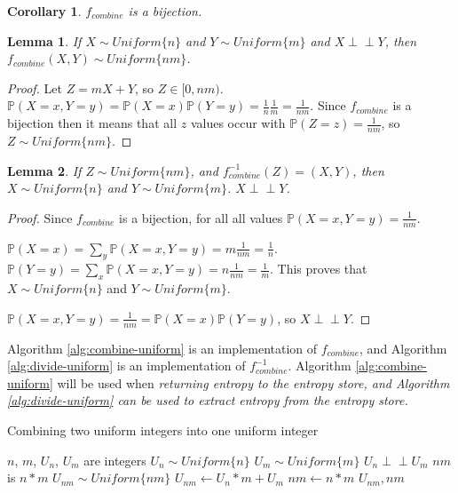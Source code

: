 \documentclass[12pt]{article}
\newtheorem{lemma}{Lemma}
\newtheorem{corollary}{Corollary}
\newcommand{\indep}{\perp\!\!\!\perp}
\begin{document}
\begin{corollary}
    $f_{combine}$ is a bijection.
\end{corollary}

\begin{lemma}
    If $X \sim Uniform\{n\}$ and $Y \sim Uniform\{m\}$ and $X \indep Y$, then 
    $f_{combine}(X,Y) \sim Uniform \{nm\}$.
\end{lemma}

\begin{proof}
    Let $Z = mX+Y$, so $Z \in [0,nm)$. $\mathbb{P}(X=x,Y=y) = \mathbb{P}(X=x)\mathbb{P}(Y=y) = \frac{1}{n}\frac{1}{m} = \frac{1}{nm}$. Since $f_{combine}$ is a bijection then it means that all $z$ values occur with $\mathbb{P}(Z=z) = \frac{1}{nm}$, so $Z \sim Uniform\{nm\}$.
    
\end{proof}

\begin{lemma}
    If $Z \sim Uniform \{nm\}$, and $f^{-1}_{combine}(Z) = (X,Y)$, then $X \sim Uniform\{n\}$ and $Y \sim Uniform\{m\}$. $X \indep Y$.
    \label{lem:combine-independent}
\end{lemma}

\begin{proof}
    Since $f_{combine}$ is a bijection, for all all values $\mathbb{P}(X=x,Y=y) = \frac{1}{nm}$.

    $\mathbb{P}(X=x) = \sum_{y}\mathbb{P}(X=x,Y=y) = m\frac{1}{nm} = \frac{1}{n}$. $\mathbb{P}(Y=y) = \sum_{x}\mathbb{P}(X=x,Y=y) = n\frac{1}{nm} = \frac{1}{m}$. This proves that $X\sim Uniform\{n\}$ and $Y\sim Uniform\{m\}$.

    $\mathbb{P}(X=x,Y=y) = \frac{1}{nm} = \mathbb{P}(X=x)\mathbb{P}(Y=y)$, so $X \indep Y$.
\end{proof}

Algorithm \ref{alg:combine-uniform} is an implementation of $f_{combine}$, and Algorithm \ref{alg:divide-uniform} is an implementation of $f^{-1}_{combine}$. Algorithm \ref{alg:combine-uniform} will be used when \em returning \em entropy to the entropy store, and Algorithm \ref{alg:divide-uniform} can be used to extract entropy from the entropy store.

\begin{algorithm}
\caption{Combining two uniform integers into one uniform integer}
\label{alg:combine-uniform}
\begin{algorithmic}[1]
    \Require $n$, $m$, $U_n$, $U_m$ are integers
    \Require $U_n \sim Uniform\{n\}$
    \Require $U_m \sim Uniform\{m\}$
    \Require $U_n \indep U_m$
    \Ensure $nm$ is $n * m$
    \Ensure $U_{nm} \sim Uniform\{nm\}$
  \State $U_{nm} \gets U_n * m + U_m$
  \State $nm \gets n * m$
  \State \Return $U_{nm}, nm$
\EndProcedure
\end{algorithmic}
\end{algorithm}
\end{document}
